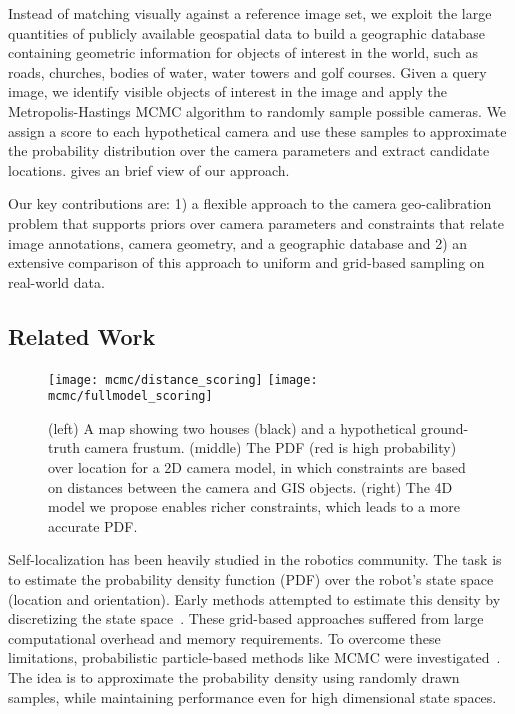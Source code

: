 Instead of matching visually against a reference image set, we exploit
the large quantities of publicly available geospatial data to build a
geographic database containing geometric information for objects of
interest in the world, such as roads, churches, bodies of water, water
towers and golf courses.  Given a query image, we identify visible
objects of interest in the image and apply the Metropolis-Hastings
MCMC algorithm to randomly sample possible cameras.  We assign a score
to each hypothetical camera and use these samples to approximate the
probability distribution over the camera parameters and extract
candidate locations.  gives an brief view of our
approach.

Our key contributions are: 1) a flexible approach to the camera
geo-calibration problem that supports priors over camera parameters
and constraints that relate image annotations, camera geometry, and a
geographic database and 2) an extensive comparison of this approach to
uniform and grid-based sampling on real-world data.

\subsection{Related Work}

\begin{figure}[t]

  \centering

  \hfill
  \texttt{[image: mcmc/distance\_scoring]}
  \hfill
  \texttt{[image: mcmc/fullmodel\_scoring]}

  \caption{(left) A map showing two houses (black) and a hypothetical
    ground-truth camera frustum. (middle) The PDF (red is high
    probability) over location for a 2D camera model, in which
    constraints are based on distances between the camera and GIS
  objects. (right) The 4D model we propose enables richer constraints,
  which leads to a more accurate PDF.}

  \label{fig:diffmodel}
\end{figure}

Self-localization has been heavily studied in the robotics community. The task is to
estimate the probability density function (PDF) over the robot's state
space (location and orientation). Early methods attempted to estimate
this density by discretizing the state
space~\cite{burgard1996estimating}. These grid-based approaches
suffered from large computational overhead and memory requirements. To
overcome these limitations, probabilistic particle-based methods like
MCMC were
investigated~\cite{dellaert1999using,fox1999monte,gutmann1998experimental,oh2004map}.
The idea is to approximate the probability density using randomly drawn
samples, while maintaining performance even for high dimensional state
spaces.

